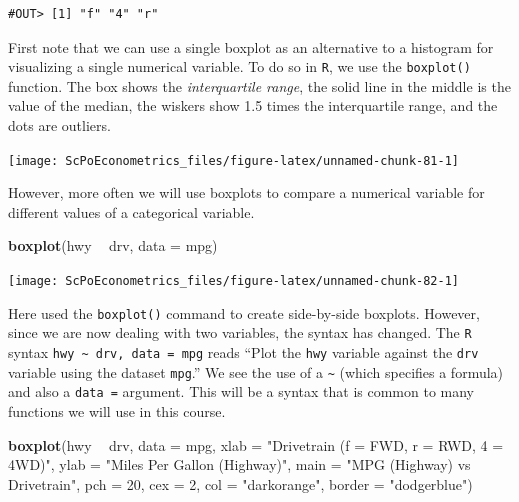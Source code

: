 \documentclass[]{book}
\newenvironment{Shaded}{\begin{snugshade}}{\end{snugshade}}
\newcommand{\KeywordTok}[1]{\textcolor[rgb]{0.13,0.29,0.53}{\textbf{#1}}}
\newcommand{\DataTypeTok}[1]{\textcolor[rgb]{0.13,0.29,0.53}{#1}}
\newcommand{\DecValTok}[1]{\textcolor[rgb]{0.00,0.00,0.81}{#1}}
\newcommand{\StringTok}[1]{\textcolor[rgb]{0.31,0.60,0.02}{#1}}
\newcommand{\OperatorTok}[1]{\textcolor[rgb]{0.81,0.36,0.00}{\textbf{#1}}}
\newcommand{\NormalTok}[1]{#1}
\begin{document}
\begin{verbatim}
#OUT> [1] "f" "4" "r"
\end{verbatim}

First note that we can use a single boxplot as an alternative to a
histogram for visualizing a single numerical variable. To do so in
\texttt{R}, we use the \texttt{boxplot()} function. The box shows the
\emph{interquartile range}, the solid line in the middle is the value of
the median, the wiskers show 1.5 times the interquartile range, and the
dots are outliers.

\begin{Shaded}
\end{Shaded}

\begin{center}\texttt{[image: ScPoEconometrics\_files/figure-latex/unnamed-chunk-81-1]} \end{center}

However, more often we will use boxplots to compare a numerical variable
for different values of a categorical variable.

\begin{Shaded}
\begin{Highlighting}[]
\KeywordTok{boxplot}\NormalTok{(hwy }\OperatorTok{~}\StringTok{ }\NormalTok{drv, }\DataTypeTok{data =}\NormalTok{ mpg)}
\end{Highlighting}
\end{Shaded}

\begin{center}\texttt{[image: ScPoEconometrics\_files/figure-latex/unnamed-chunk-82-1]} \end{center}

Here used the \texttt{boxplot()} command to create side-by-side
boxplots. However, since we are now dealing with two variables, the
syntax has changed. The \texttt{R} syntax
\texttt{hwy\ \textasciitilde{}\ drv,\ data\ =\ mpg} reads ``Plot the
\texttt{hwy} variable against the \texttt{drv} variable using the
dataset \texttt{mpg}.'' We see the use of a \texttt{\textasciitilde{}}
(which specifies a formula) and also a \texttt{data\ =} argument. This
will be a syntax that is common to many functions we will use in this
course.

\begin{Shaded}
\begin{Highlighting}[]
\KeywordTok{boxplot}\NormalTok{(hwy }\OperatorTok{~}\StringTok{ }\NormalTok{drv, }\DataTypeTok{data =}\NormalTok{ mpg,}
     \DataTypeTok{xlab   =} \StringTok{"Drivetrain (f = FWD, r = RWD, 4 = 4WD)"}\NormalTok{,}
     \DataTypeTok{ylab   =} \StringTok{"Miles Per Gallon (Highway)"}\NormalTok{,}
     \DataTypeTok{main   =} \StringTok{"MPG (Highway) vs Drivetrain"}\NormalTok{,}
     \DataTypeTok{pch    =} \DecValTok{20}\NormalTok{,}
     \DataTypeTok{cex    =} \DecValTok{2}\NormalTok{,}
     \DataTypeTok{col    =} \StringTok{"darkorange"}\NormalTok{,}
     \DataTypeTok{border =} \StringTok{"dodgerblue"}\NormalTok{)}
\end{Highlighting}
\end{Shaded}
\end{document}

